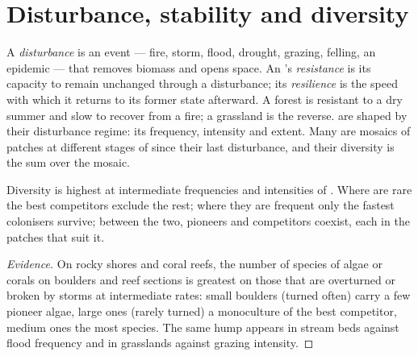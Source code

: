 \section{Disturbance, stability and diversity}

\begin{definition}\label{def:b1:ecosystem-dynamics:disturbance}
A \emph{disturbance} is an event --- fire, storm, flood, drought,
grazing, felling, an epidemic --- that removes biomass and opens
space. An 's \emph{resistance} is its capacity to remain
unchanged through a disturbance; its \emph{resilience} is the speed
with which it returns to its former state afterward. A forest is
resistant to a dry summer and slow to recover from a fire; a
grassland is the reverse.  are shaped by their
disturbance regime: its frequency, intensity and extent. Many
 are mosaics of patches at different stages of
 since their last disturbance, and their diversity is the
sum over the mosaic.
\end{definition}

\begin{proposition}\label{prop:b1:ecosystem-dynamics:idh}
Diversity is highest at intermediate frequencies and intensities of
. Where  are rare the best competitors
exclude the rest; where they are frequent only the fastest
colonisers survive; between the two, pioneers and competitors
coexist, each in the patches that suit it.
\end{proposition}
\begin{proof}[Evidence]
On rocky shores and coral reefs, the number of species of algae or
corals on boulders and reef sections is greatest on those that are
overturned or broken by storms at intermediate rates: small boulders
(turned often) carry a few pioneer algae, large ones (rarely turned)
a monoculture of the best competitor, medium ones the most species.
The same hump appears in stream beds against flood frequency and in
grasslands against grazing intensity.
\end{proof}

